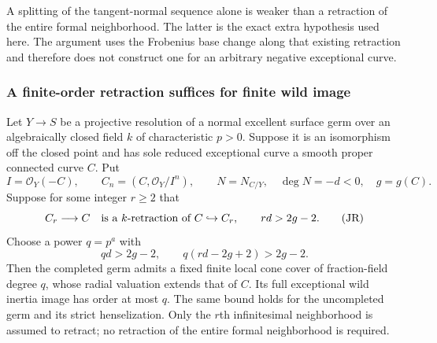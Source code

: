 \begin{remark}
A splitting of the tangent-normal sequence alone is
weaker than a retraction of the entire formal
neighborhood.  The latter is the exact extra hypothesis
used here.  The argument uses the Frobenius base change
along that existing retraction and therefore does not
construct one for an arbitrary negative exceptional curve.
\end{remark}

\subsubsection{A finite-order retraction suffices for finite wild image}

\begin{proposition}
\label{D:finite-jet-cone-cover}
Let $Y\to S$ be a projective resolution of a normal excellent
surface germ over an algebraically closed field $k$ of
characteristic $p>0$.  Suppose it is an isomorphism off the
closed point and has sole reduced exceptional curve a smooth
proper connected curve $C$.  Put
\[
 I=\mathcal O_Y(-C),\qquad
 C_n=(C,\mathcal O_Y/I^n),\qquad
 N=N_{C/Y},\quad \deg N=-d<0,\quad g=g(C).
\]
Suppose for some integer $r\geq2$ that
\[
 C_r\longrightarrow C
 \quad\hbox{is a $k$-retraction of }C\hookrightarrow C_r,
 \qquad rd>2g-2.                                      \tag{JR}
\]
Choose a power $q=p^a$ with
\[
       qd>2g-2,\qquad q(rd-2g+2)>2g-2.                \tag{JQ}
\]
Then the completed germ admits a fixed finite local cone
cover of fraction-field degree $q$, whose radial valuation
extends that of $C$.  Its full exceptional wild inertia image
has order at most $q$.  The same bound holds for the
uncompleted germ and its strict henselization.
Only the $r$th infinitesimal neighborhood is assumed to
retract; no retraction of the entire formal neighborhood
is required.
\end{proposition}

